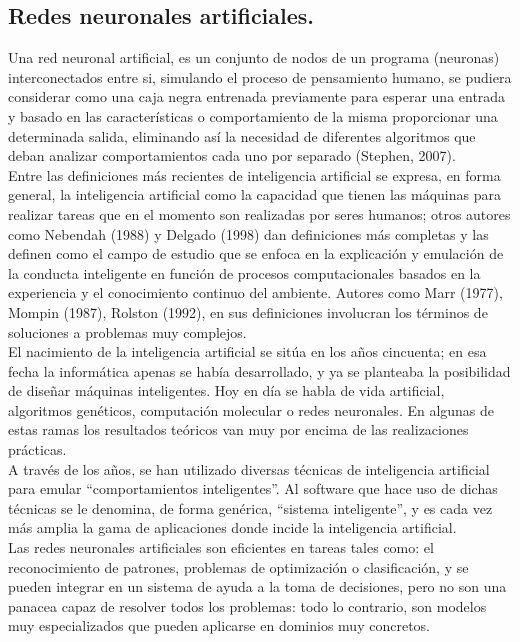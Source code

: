 \subsection{Redes neuronales artificiales.}

Una red neuronal artificial,  es un conjunto de nodos de un programa (neuronas) interconectados entre si, simulando el proceso de pensamiento humano, se pudiera considerar como una caja negra entrenada previamente para esperar una entrada y basado en las características o comportamiento de la misma proporcionar una determinada salida, eliminando así la necesidad de diferentes algoritmos que deban analizar comportamientos cada uno por separado (Stephen, 2007).\\

Entre las definiciones más recientes de inteligencia artificial se expresa, en forma general, la inteligencia artificial como la capacidad que tienen las máquinas para realizar tareas que en el momento son realizadas por seres humanos; otros autores como Nebendah (1988) y Delgado (1998) dan definiciones más completas y las definen como el campo de estudio que se enfoca en la explicación y emulación de la conducta inteligente en función de procesos computacionales basados en la experiencia y el conocimiento continuo del ambiente. Autores como Marr (1977), Mompin (1987), Rolston (1992), en sus definiciones involucran los términos de soluciones a problemas muy complejos.\\

El nacimiento de la inteligencia artificial se sitúa en los años cincuenta; en esa fecha la informática apenas se había desarrollado, y ya se planteaba la posibilidad de diseñar máquinas inteligentes. Hoy en día se habla de vida artificial, algoritmos genéticos, computación molecular o redes neuronales. En algunas de estas ramas los resultados teóricos van muy por encima de las realizaciones prácticas.\\

A través de los años, se han utilizado diversas técnicas de inteligencia artificial para emular ``comportamientos inteligentes''. Al software que hace uso de dichas técnicas se le denomina, de forma genérica, ``sistema inteligente'', y es cada vez más amplia la gama de aplicaciones donde incide la inteligencia artificial.\\

Las redes neuronales artificiales son eficientes en tareas tales como: el reconocimiento de patrones, problemas de optimización o clasificación, y se pueden integrar en un sistema de ayuda a la toma de decisiones, pero no son una panacea capaz de resolver todos los problemas: todo lo contrario, son modelos muy especializados que pueden aplicarse en dominios muy concretos.\\

